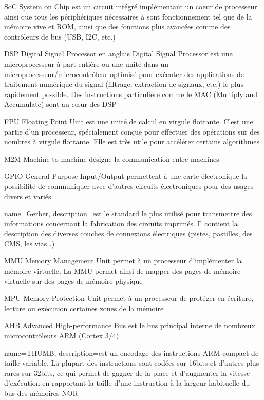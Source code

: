 {SoC}
{System on Chip}
{est un circuit intégré implémentant un coeur de processeur ainsi que tous les périphériques nécessaires à sont fonctionnement tel que de la mémoire vive et ROM, ainsi que des fonctions plus avancées comme des contrôleurs de bus (USB, I2C, etc.)}


{DSP}
{Digital Signal Processor}
{en anglais Digital Signal Processor est une microprocesseur à part entière ou une unité dans un microprocesseur/microcontrôleur optimisé pour exécuter des applications de traitement numérique du signal (filtrage, extraction de signaux, etc.) le plus rapidement possible. Des instructions particulière comme le MAC (Multiply and Accumulate) sont au cœur des DSP}


{FPU}
{Floating Point Unit}
{est une unité de calcul en virgule flottante. C'est une partie d'un processeur, spécialement conçue pour effectuer des opérations sur des nombres à virgule flottante. Elle est très utile pour accélérer certains algorithmes}


{M2M}
{Machine to machine}
{désigne la communication entre machines}

{GPIO}
{General Purpose Input/Output}
{permettent à une carte électronique la possibilité de communiquer avec d'autres circuits électroniques pour des usages divers et variés}

{
	name=Gerber,
	description={est le standard le plus utilisé pour transmettre des informations concernant la fabrication des circuits imprimés.
		Il contient la description des diverses couches de connexions électriques (pistes, pastilles,  des CMS, les vias…)}
}

{MMU}
{Memory Management Unit}
{permet à un processeur d'implémenter la mémoire virtuelle. La MMU permet ainsi de mapper des pages de mémoire virtuelle sur des pages de mémoire physique}

{MPU}
{Memory Protection Unit}
{permet à un processeur de protéger en écriture, lecture ou exécution certaines zones de la mémoire}


{AHB}
{Advanced High-performance Bus}
{est le bus principal interne de nombreux microcontrôleurs ARM (Cortex 3/4)}

{
	name=THUMB,
	description={est un encodage des instructions ARM compact de taille variable. La plupart des instructions sont codées sur 16bits et d'autres plus rares sur 32bits, ce qui permet de gagner de la place et d'augmenter la vitesse d'exécution en rapportant la taille d'une instruction à la largeur habituelle du bus des mémoires NOR}
}

